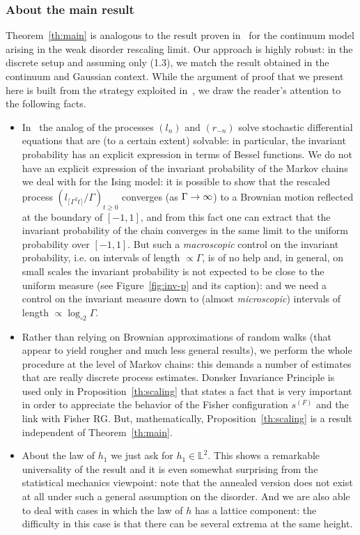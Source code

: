 \documentclass[AHL,Unicode,longabstracts,published]{cedram}
\newcommand{\bbL}{\mathbb{L}}
\newcommand{\gG}{\Gamma}
\newcommand{\loglog}{\log_{\circ 2}}
\renewcommand*{\to}{\mathchoice{\longrightarrow}{\rightarrow}{\rightarrow}{\rightarrow}}
\begin{document}
\subsubsection{About the main result}

 Theorem~\ref{th:main} is analogous to the result proven in~\cite{cf:CGH1} for the continuum model arising in the weak disorder rescaling limit. Our approach is highly robust: in the discrete setup and assuming only (1.3), we match the result obtained in the continuum and Gaussian context. While the argument of proof that we present here is built from the strategy exploited in~\cite{cf:CGH1}, we draw the reader's attention to the following facts.
\begin{itemize}
\item In~\cite{cf:CGH1} the analog of the processes $(l_n)$ and $(r_{-n})$ solve stochastic differential equations that are (to a certain extent) solvable: in particular, the invariant probability has an explicit expression in terms of Bessel functions. We do not have an explicit expression of the invariant probability of the Markov chains we deal with for the Ising model: it is possible to show that the rescaled process $(l_{\lceil \gG^2t\rceil}/\gG)_{t \ge 0}$ converges (as $\gG \to \infty$) to a Brownian motion reflected at the boundary of $[-1,1]$, and from this fact one can extract that the invariant probability of the chain converges in the same limit to the uniform probability over $[-1,1]$. But such a \emph{macroscopic} control on the invariant probability, i.e. on intervals of length $\propto\! \gG$, is of no help and, in general, on small scales the invariant probability is not expected to be close to the uniform measure (see Figure~\ref{fig:inv-p} and its caption): and we need a control on the invariant measure down to (almost \emph{microscopic}) intervals of length $\propto\! \loglog \gG$.
\item Rather than relying on Brownian approximations of random walks (that appear to yield rougher and much less general results), we perform the whole procedure at the level of Markov chains: this demands a number of estimates that are really discrete process estimates. Donsker Invariance Principle is used only in Proposition~\ref{th:scaling} that states a fact that is very important in order to appreciate the behavior of the Fisher configuration $s^{(F)}$ and the link with Fisher RG. But, mathematically, Proposition~\ref{th:scaling} is a result independent of Theorem~\ref{th:main}.
\item About the law of $h_1$ we just ask for $h_1 \in \bbL^2$. This shows a remarkable universality of the result and it is even somewhat surprising from the statistical mechanics viewpoint: note that the annealed version does not exist at all under such a general assumption on the disorder. And we are also able to deal with cases in which the law of $h$ has a lattice component: the difficulty in this case is that there can be several extrema at the same height.

\end{itemize}
\end{document}

